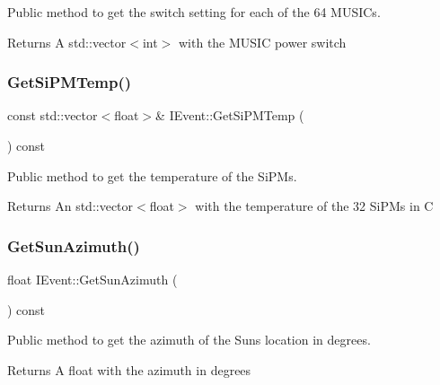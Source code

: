 Public method to get the switch setting for each of the 64 M\+U\+S\+I\+Cs. 

\begin{DoxyReturn}{Returns}
A std\+::vector$<$int$>$ with the M\+U\+S\+IC power switch 
\end{DoxyReturn}
\mbox{\label{classIEvent_a575edf25bf25511b33b8555adea334af}} 
\subsubsection{\texorpdfstring{Get\+Si\+P\+M\+Temp()}{GetSiPMTemp()}}
{\footnotesize\ttfamily const std\+::vector$<$float$>$\& I\+Event\+::\+Get\+Si\+P\+M\+Temp (\begin{DoxyParamCaption}{ }\end{DoxyParamCaption}) const}



Public method to get the temperature of the Si\+P\+Ms. 

\begin{DoxyReturn}{Returns}
An std\+::vector$<$float$>$ with the temperature of the 32 Si\+P\+Ms in C 
\end{DoxyReturn}
\mbox{\label{classIEvent_a03e72e60f05ac529c27ed7b916561778}} 
\subsubsection{\texorpdfstring{Get\+Sun\+Azimuth()}{GetSunAzimuth()}}
{\footnotesize\ttfamily float I\+Event\+::\+Get\+Sun\+Azimuth (\begin{DoxyParamCaption}{ }\end{DoxyParamCaption}) const}



Public method to get the azimuth of the Sun\textquotesingle{}s location in degrees. 

\begin{DoxyReturn}{Returns}
A float with the azimuth in degrees 
\end{DoxyReturn}
\mbox{\label{classIEvent_a35b19d2db7a0b35c3d0e5219fb619976}} 
